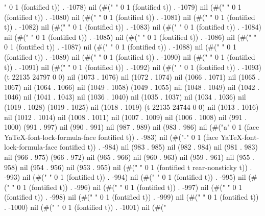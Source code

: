 " 0 1 (fontified t)) . -1078) nil (#(" " 0 1 (fontified t)) . -1079) nil (#(" " 0 1 (fontified t)) . -1080) nil (#(" " 0 1 (fontified t)) . -1081) nil (#(" " 0 1 (fontified t)) . -1082) nil (#(" " 0 1 (fontified t)) . -1083) nil (#(" " 0 1 (fontified t)) . -1084) nil (#(" " 0 1 (fontified t)) . -1085) nil (#(" " 0 1 (fontified t)) . -1086) nil (#(" " 0 1 (fontified t)) . -1087) nil (#(" " 0 1 (fontified t)) . -1088) nil (#(" " 0 1 (fontified t)) . -1089) nil (#(" " 0 1 (fontified t)) . -1090) nil (#(" " 0 1 (fontified t)) . -1091) nil (#(" " 0 1 (fontified t)) . -1092) nil (#(" " 0 1 (fontified t)) . -1093) (t 22135 24797 0 0) nil (1073 . 1076) nil (1072 . 1074) nil (1066 . 1071) nil (1065 . 1067) nil (1064 . 1066) nil (1049 . 1058) (1049 . 1055) nil (1048 . 1049) nil (1042 . 1046) nil (1041 . 1043) nil (1036 . 1040) nil (1035 . 1037) nil (1034 . 1036) nil (1019 . 1028) (1019 . 1025) nil (1018 . 1019) (t 22135 24744 0 0) nil (1013 . 1016) nil (1012 . 1014) nil (1008 . 1011) nil (1007 . 1009) nil (1006 . 1008) nil (991 . 1000) (991 . 997) nil (990 . 991) nil (987 . 989) nil (983 . 986) nil (#("a" 0 1 (face YaTeX-font-lock-formula-face fontified t)) . -983) nil (#("-" 0 1 (face YaTeX-font-lock-formula-face fontified t)) . -984) nil (983 . 985) nil (982 . 984) nil (981 . 983) nil (966 . 975) (966 . 972) nil (965 . 966) nil (960 . 963) nil (959 . 961) nil (955 . 958) nil (954 . 956) nil (953 . 955) nil (#("
" 0 1 (fontified t rear-nonsticky t)) . -993) nil (#(" " 0 1 (fontified t)) . -994) nil (#(" " 0 1 (fontified t)) . -995) nil (#(" " 0 1 (fontified t)) . -996) nil (#(" " 0 1 (fontified t)) . -997) nil (#(" " 0 1 (fontified t)) . -998) nil (#(" " 0 1 (fontified t)) . -999) nil (#(" " 0 1 (fontified t)) . -1000) nil (#(" " 0 1 (fontified t)) . -1001) nil (#("
